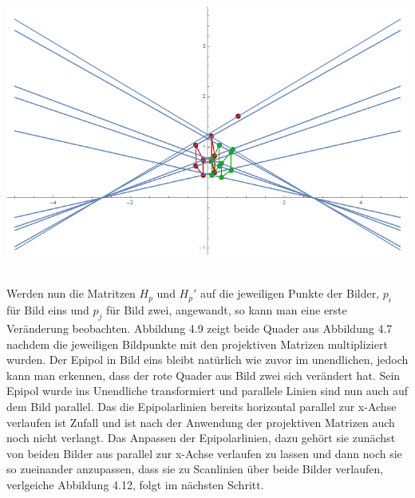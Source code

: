 \begin{minipage}{\linewidth}
	\centering
	\includegraphics[width=.8\linewidth]{images/Rectification_two_same_Solutions.png}
\end{minipage}\\


Werden nun die Matritzen $H_p$ und $H_p'$ auf die jeweiligen Punkte der Bilder, $p_i$ für Bild eins und $p_j$ für Bild zwei, angewandt, so kann man eine erste Veränderung beobachten. Abbildung 4.9 zeigt beide Quader aus Abbildung 4.7 nachdem die jeweiligen Bildpunkte mit den projektiven Matrizen multipliziert wurden. Der Epipol in Bild eins bleibt natürlich wie zuvor im unendlichen, jedoch kann man erkennen, dass der rote Quader aus Bild zwei sich verändert hat. Sein Epipol wurde ins Unendliche transformiert und parallele Linien sind nun auch auf dem Bild parallel. Das die Epipolarlinien bereits horizontal parallel zur x-Achse verlaufen ist Zufall und ist nach der Anwendung der projektiven Matrizen auch noch nicht verlangt. Das Anpassen der Epipolarlinien, dazu gehört sie zunächst von beiden Bilder aus parallel zur x-Achse verlaufen zu lassen und dann noch sie so zueinander anzupassen, dass sie zu Scanlinien über beide Bilder verlaufen, verlgeiche Abbildung 4.12, folgt im nächsten Schritt. \\


